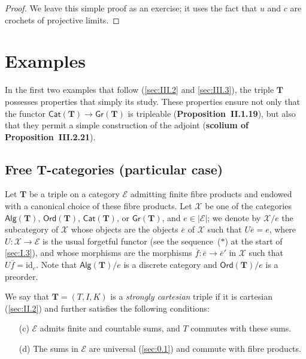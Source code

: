 \documentclass[fleqn]{article}
\newcommand{\oldpage}[1]{\marginpar{\footnotesize$\Big\vert$ \textit{p.~#1}}}
\newcommand{\unsure}[1]{{\color{purple}\textbf{#1}}}
\newcommand{\id}{\mathrm{id}}
\newcommand{\TT}{\mathbf{T}}
\newcommand{\cat}[1]{\mathcal{#1}}
\newcommand{\Cat}[1]{\mathsf{#1}}
\newcommand{\set}[1]{|#1|}
\newcommand{\Gr}[1]{\Cat{Gr}(#1)}
\newcommand{\Alg}[1]{\Cat{Alg}(#1)}
\newcommand{\Ord}[1]{\Cat{Ord}(#1)}
\begin{document}
\begin{proof}
  We leave this simple proof as an exercise;
  it uses the fact that $u$ and $c$ are crochets of projective limits.
\end{proof}




\section{Examples}
\label{sec:III}

\oldpage{267}
In the first two examples that follow (\cref{sec:III.2} and \cref{sec:III.3}), the triple $\TT$ possesses properties that simply its study.
These properties ensure not only that the functor $\Cat{Cat}(\TT)\to\Gr{\TT}$ is tripleable (\unsure{Proposition~II.1.19}), but also that they permit a simple construction of the adjoint (\unsure{scolium of Proposition~III.2.21}).



\subsection{Free $\TT$-categories (particular case)}
\label{sec:III.1}

Let $\TT$ be a triple on a category $\cat{E}$ admitting finite fibre products and endowed with a canonical choice of these fibre products.
Let $\cat{X}$ be one of the categories $\Alg{\TT}$, $\Ord{\TT}$, $\Cat{Cat}(\TT)$, or $\Gr{\TT}$, and $e\in\set{\cat{E}}$;
we denote by $\cat{X}/e$ the subcategory of $\cat{X}$ whose objects are the objects $\overline{e}$ of $\cat{X}$ such that $U\overline{e}=e$, where $U\colon\cat{X}\to\cat{E}$ is the usual forgetful functor (see the sequence~($\ast$) at the start of \cref{sec:I.3}), and whose morphisms are the morphisms $\overline{f}\colon\overline{e}\to\overline{e}'$ in $\cat{X}$ such that $U\overline{f}=\id_e$.
Note that $\Alg{\TT}/e$ is a discrete category and $\Ord{\TT}/e$ is a preorder.

We say that $\TT=(T,I,K)$ is a \emph{strongly cartesian} triple if it is cartesian (\cref{sec:II.2}) and further satisfies the following conditions:

\begin{enumerate}
  \item[(c)] $\cat{E}$ admits finite and countable sums, and $T$ commutes with these sums.
  \item[(d)] The sums in $\cat{E}$ are universal (\cref{sec:0.1}) and commute with fibre products.
\end{enumerate}
\end{document}
